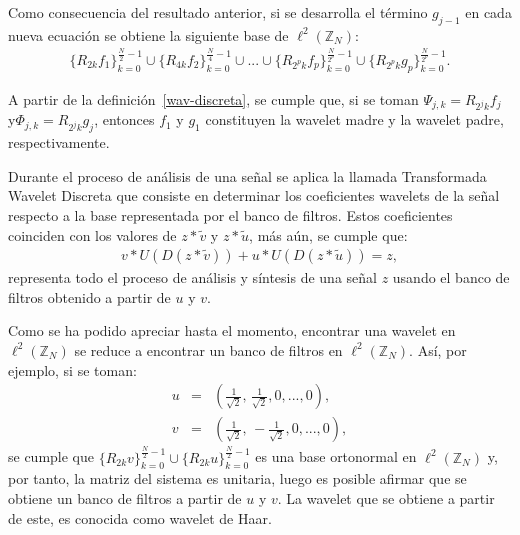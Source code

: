 \par Como consecuencia del resultado anterior, si se desarrolla el t\'ermino $g_{j-1}$ en cada nueva ecuaci\'on se obtiene la siguiente base de $\ell^2\left(\mathbb{Z}_N\right)$:
\begin{eqnarray}
\{R_{2k}f_1\}_{k=0}^{\frac{N}{2}-1}\cup\{R_{4k}f_2\}_{k=0}^{\frac{N}{4}-1}\cup ...\cup\{R_{2^{p}k}f_{p}\}_{k=0}^{\frac{N}{2^{p}}-1}\cup\{R_{2^{p}k}g_{p}\}_{k=0}^{\frac{N}{2^{p}}-1}.\nonumber
\end{eqnarray}

\par A partir de la definici\'on~\ref{wav-discreta}, se cumple que, si se toman $\Psi_{j,k}=R_{2^jk}f_j$ y\linebreak $\Phi_{j,k}=R_{2^jk}g_j$, entonces $f_1$ y $g_1$ constituyen la wavelet madre y la wavelet padre, respectivamente.\\

\par Durante el proceso de an\'alisis de una se\~nal se aplica la llamada Transformada Wavelet Discreta que consiste en determinar los coeficientes wavelets de la se\~nal respecto a la base representada por el banco de filtros. Estos coeficientes coinciden con los valores de $z\ast\tilde{v}$ y $z\ast\tilde{u}$, m\'as a\'un, se cumple que:
\begin{eqnarray}
v\ast U(D(z\ast\tilde{v}))+u\ast U(D(z\ast\tilde{u}))=z,\nonumber
\end{eqnarray}
representa todo el proceso de an\'alisis y s\'intesis de una se\~nal $z$ usando el banco de filtros obtenido a partir de $u$ y $v$.\\

\par Como se ha podido apreciar hasta el momento, encontrar una wavelet en $\ell^2\left(\mathbb{Z}_N\right)$ se reduce a encontrar un banco de filtros en $\ell^2\left(\mathbb{Z}_N\right)$. As\'i, por ejemplo, si se toman:
\begin{eqnarray}
u&=&\left(\frac{1}{\sqrt{2}},\,\frac{1}{\sqrt{2}},0,...,0\right),\nonumber\\
v&=&\left(\frac{1}{\sqrt{2}},\,-\frac{1}{\sqrt{2}},0,...,0\right),\nonumber
\end{eqnarray}
se cumple que $\{R_{2k}v\}_{k=0}^{\frac{N}{2}-1}\cup\{R_{2k}u\}_{k=0}^{\frac{N}{2}-1}$ es una base ortonormal en $\ell^2\left(\mathbb{Z}_N\right)$ y, por tanto, la matriz del sistema es unitaria, luego es posible afirmar que se obtiene un banco de filtros a partir de $u$ y $v$. La wavelet que se obtiene a partir de este, es conocida como wavelet de Haar.\\

